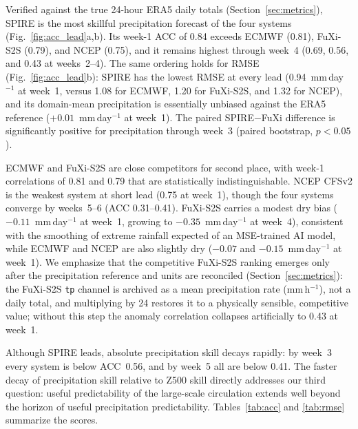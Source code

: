 \documentclass[11pt]{article}
\begin{document}
Verified against the true 24-hour ERA5 daily totals
(Section~\ref{sec:metrics}), SPIRE is the most skillful precipitation
forecast of the four systems (Fig.~\ref{fig:acc_lead}a,b). Its week-1
ACC of 0.84 exceeds ECMWF (0.81), FuXi-S2S (0.79), and NCEP (0.75),
and it remains highest through week~4 (0.69, 0.56, and 0.43 at
weeks~2--4). The same ordering holds for RMSE
(Fig.~\ref{fig:acc_lead}b): SPIRE has the lowest RMSE at every lead
(0.94~mm\,day$^{-1}$ at week~1, versus 1.08 for ECMWF, 1.20 for
FuXi-S2S, and 1.32 for NCEP), and its domain-mean precipitation is
essentially unbiased against the ERA5 reference
($+0.01$~mm\,day$^{-1}$ at week~1). The paired SPIRE$-$FuXi difference is significantly positive for
precipitation through week~3 (paired bootstrap, $p<0.05$).

ECMWF and FuXi-S2S are close competitors for second place, with
week-1 correlations of 0.81 and 0.79 that are statistically
indistinguishable. NCEP CFSv2 is the weakest system at short lead (0.75
at week~1), though the four systems converge by weeks~5--6 (ACC
0.31--0.41). FuXi-S2S carries a modest dry bias
($-0.11$~mm\,day$^{-1}$ at week~1, growing to $-0.35$~mm\,day$^{-1}$
at week~4), consistent with the smoothing of extreme rainfall expected of
an MSE-trained AI model, while ECMWF and NCEP are also slightly dry
($-0.07$ and $-0.15$~mm\,day$^{-1}$ at week~1). We emphasize that the
competitive FuXi-S2S ranking emerges only after the precipitation
reference and units are reconciled (Section~\ref{sec:metrics}): the
FuXi-S2S \texttt{tp} channel is archived as a mean precipitation rate
(mm\,h$^{-1}$), not a daily total, and multiplying by 24 restores it to
a physically sensible, competitive value; without this step the anomaly
correlation collapses artificially to 0.43 at week~1.

Although SPIRE leads, absolute precipitation skill decays rapidly: by
week~3 every system is below ACC~0.56, and by week~5 all are
below 0.41. The faster decay of precipitation skill relative to Z500
skill directly addresses our third question: useful predictability of the
large-scale circulation extends well beyond the horizon of useful
precipitation predictability. Tables~\ref{tab:acc} and \ref{tab:rmse}
summarize the scores.
\end{document}
